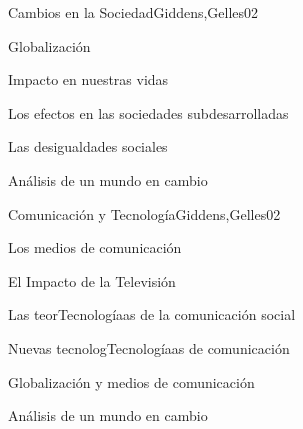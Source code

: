 \begin{syllabus}
\begin{unit}{Cambios en la Sociedad}{Giddens,Gelles}{0}{2}
    \begin{topics}
      \item Globalización
      \item Impacto en nuestras vidas
      \item Los efectos en las sociedades subdesarrolladas
      \item Las desigualdades sociales
    \end{topics}
    \begin{learningoutcomes}
      \item Análisis de un mundo en cambio
    \end{learningoutcomes}
\end{unit}

\begin{unit}{Comunicación y Tecnología}{Giddens,Gelles}{0}{2}
    \begin{topics}
      \item Los medios de comunicación
      \item El Impacto de la Televisión
      \item Las teorTecnologíaas de la comunicación social
      \item Nuevas tecnologTecnologíaas de comunicación
      \item Globalización y medios de comunicación
    \end{topics}
    \begin{learningoutcomes}
      \item Análisis de un mundo en cambio
    \end{learningoutcomes}
\end{unit}



\begin{coursebibliography}
\end{coursebibliography}

\end{syllabus}
